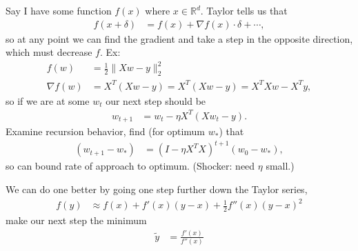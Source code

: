 \documentclass[11pt,letterpaper]{article}
\numberwithin{equation}{section}
\numberwithin{figure}{section}
\begin{document}
Say I have some function $f(x)$ where $x \in \mathbb{R}^d$. Taylor tells us that
%
\begin{align}
	f(x + \delta) &= f(x) + \nabla f(x) \cdot \delta + \cdots,
\end{align}
%
so at any point we can find the gradient and take a step in the opposite direction, which must decrease $f$. Ex:
%
\begin{align}
	f(w) &= \frac{1}{2} \|X w - y\|_2^2\\
	\nabla f(w) &= X^T(Xw -y) = X^T (Xw -y) = X^T X w - X^T y,
\end{align}
%
so if we are at some $w_t$ our next step should be
%
\begin{align}
	w_{t+1} &= w_t - \eta X^T(X w_t - y).
\end{align}
%
Examine recursion behavior, find (for optimum $w_\ast$) that
%
\begin{align}
	(w_{t+1} - w_\ast) &= \left(I - \eta X^T X \right)^{t+1} (w_0 - w_\ast),
\end{align}
%
so can bound rate of approach to optimum. (Shocker: need $\eta$ small.)


We can do one better by going one step further down the Taylor series,
%
\begin{align}
	f(y) &\approx f(x) + f'(x) (y-x) + \frac{1}{2} f''(x) (y-x)^2
\end{align}
%
make our next step the minimum
%
\begin{align}
	\tilde{y} &= \frac{f'(x)}{f''(x)}
\end{align}
\end{document}
